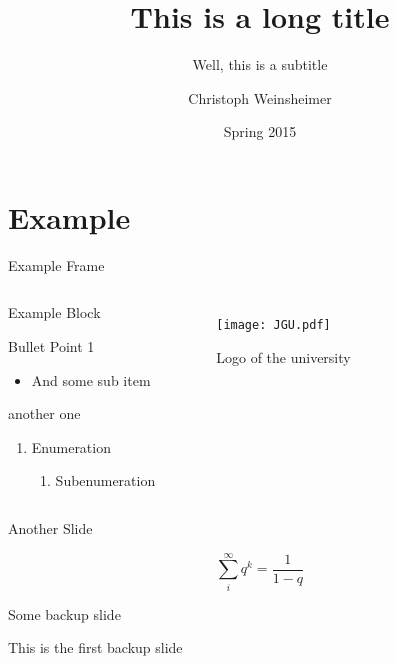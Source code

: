 \documentclass{beamer}
\title[Short Title]{This is a long title}
\subtitle{Well, this is a subtitle}
\author{Christoph Weinsheimer}
\institute[Uni Mainz]
{%
    Johannes Gutenberg-University Mainz
}
\date{Spring 2015}
\begin{document}
\maketitle



\section{Example}

\begin{frame}{Example Frame}
  \begin{columns}
      \begin{block}{Example Block}
        \begin{wideitemize}
          \item Bullet Point 1
            \begin{itemize}
              \item And some sub item
            \end{itemize}
          \item another one
        \end{wideitemize}
        \begin{enumerate}
          \item Enumeration
            \begin{enumerate}
              \item Subenumeration
            \end{enumerate}
        \end{enumerate}
      \end{block}
      \begin{figure}[ht]
        \centering
        \texttt{[image: JGU.pdf]}
        \caption{Logo of the university}
      \end{figure}
  \end{columns}
\end{frame}



\begin{frame}{Another Slide}
  \begin{center}
    \[
      \sum_i^\infty q^k = \frac{1}{1-q}
    \]
  \end{center}
\end{frame}



\backupbegin
\begin{frame}{Some backup slide}
  \begin{center}
    This is the first backup slide
  \end{center}
\end{frame}
\backupend
\end{document}
